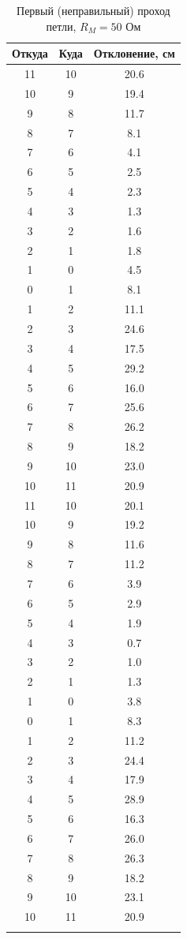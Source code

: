 \documentclass[a4paper]{article}
\begin{document}
\begin{longtable}{|c|c|c|}
	\hline
	Откуда & Куда & Отклонение, см \\
	\hline
	11 & 10 & 20.6 \\ \hline
	10 & 9 & 19.4 \\ \hline
	9 & 8 & 11.7 \\ \hline
	8 & 7 & 8.1 \\ \hline
	7 & 6 & 4.1 \\ \hline
	6 & 5 & 2.5 \\ \hline
	5 & 4 & 2.3 \\ \hline
	4 & 3 & 1.3 \\ \hline
	3 & 2 & 1.6 \\ \hline
	2 & 1 & 1.8 \\ \hline
	1 & 0 & 4.5 \\ \hline
	0 & 1 & 8.1 \\ \hline
	1 & 2 & 11.1 \\ \hline
	2 & 3 & 24.6 \\ \hline
	3 & 4 & 17.5 \\ \hline
	4 & 5 & 29.2 \\ \hline
	5 & 6 & 16.0 \\ \hline
	6 & 7 & 25.6 \\ \hline
	7 & 8 & 26.2 \\ \hline
	8 & 9 & 18.2 \\ \hline
	9 & 10 & 23.0 \\ \hline
	10 & 11 & 20.9 \\ \hline
	11 & 10 & 20.1 \\ \hline
	10 & 9 & 19.2 \\ \hline
	9 & 8 & 11.6 \\ \hline
	8 & 7 & 11.2 \\ \hline
	7 & 6 & 3.9 \\ \hline
	6 & 5 & 2.9 \\ \hline
	5 & 4 & 1.9 \\ \hline
	4 & 3 & 0.7 \\ \hline
	3 & 2 & 1.0 \\ \hline
	2 & 1 & 1.3 \\ \hline
	1 & 0 & 3.8 \\ \hline
	0 & 1 & 8.3 \\ \hline
	1 & 2 & 11.2 \\ \hline
	2 & 3 & 24.4 \\ \hline
	3 & 4 & 17.9 \\ \hline
	4 & 5 & 28.9 \\ \hline
	5 & 6 & 16.3 \\ \hline
	6 & 7 & 26.0 \\ \hline
	7 & 8 & 26.3 \\ \hline
	8 & 9 & 18.2 \\ \hline
	9 & 10 & 23.1 \\ \hline
	10 & 11 & 20.9 \\ \hline
	\caption{Первый (неправильный) проход петли, $R_M = 50$ Ом}
	\label{tab:first_attempt}
\end{longtable}
\end{document}
